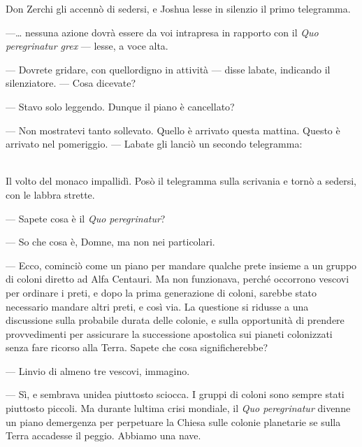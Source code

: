 Don Zerchi gli accennò di sedersi, e Joshua lesse in silenzio il primo
telegramma.

---\ldots{} nessuna azione dovrà essere da voi intrapresa in rapporto
con il \emph{Quo peregrinatur grex} --- lesse, a voce alta.

--- Dovrete gridare, con quell\textquotesingle ordigno in attività ---
disse l\textquotesingle abate, indicando il silenziatore. --- Cosa
dicevate?

--- Stavo solo leggendo. Dunque il piano è cancellato?

--- Non mostratevi tanto sollevato. Quello è arrivato questa mattina.
Questo è arrivato nel pomeriggio. --- L\textquotesingle abate gli lanciò
un secondo telegramma:

\begin{center}
\end{center}
\leavevmode\\


Il volto del monaco impallidì. Posò il telegramma sulla scrivania e
tornò a sedersi, con le labbra strette.

--- Sapete cosa è il \emph{Quo peregrinatur}?

--- So che cosa è, Domne, ma non nei particolari.

--- Ecco, cominciò come un piano per mandare qualche prete insieme a un
gruppo di coloni diretto ad Alfa Centauri. Ma non funzionava, perché
occorrono vescovi per ordinare i preti, e dopo la prima generazione di
coloni, sarebbe stato necessario mandare altri preti, e così via. La
questione si ridusse a una discussione sulla probabile durata delle
colonie, e sulla opportunità di prendere provvedimenti per assicurare la
successione apostolica sui pianeti colonizzati senza fare ricorso alla
Terra. Sapete che cosa significherebbe?

--- L\textquotesingle invio di almeno tre vescovi, immagino.

--- Sì, e sembrava un\textquotesingle idea piuttosto sciocca. I gruppi
di coloni sono sempre stati piuttosto piccoli. Ma durante
l\textquotesingle ultima crisi mondiale, il \emph{Quo peregrinatur}
divenne un piano d\textquotesingle emergenza per perpetuare la Chiesa
sulle colonie planetarie se sulla Terra accadesse il peggio. Abbiamo una
nave.


